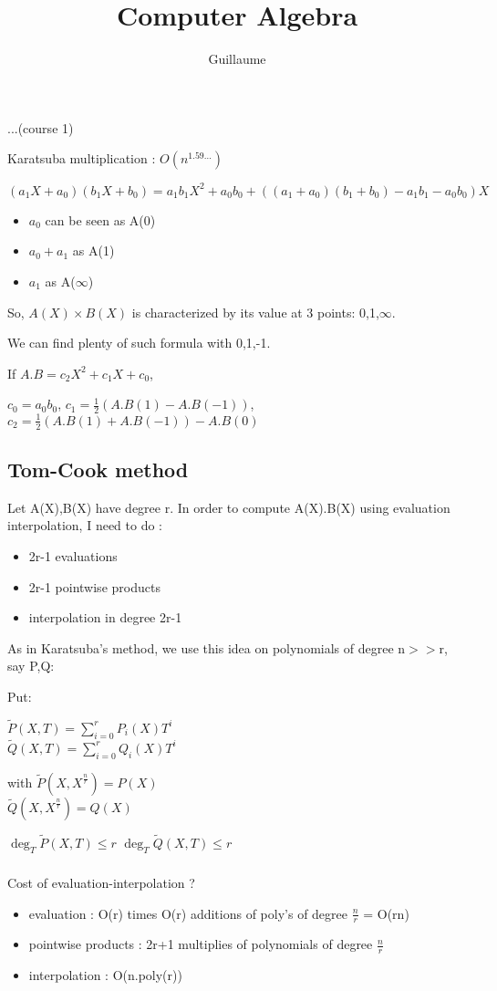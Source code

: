\documentclass{article}
\theoremstyle{definition}
\theoremstyle{remark}
\begin{document}
	
\title{Computer Algebra}
\author{Guillaume}

\maketitle
\tableofcontents

...(course 1)

Karatsuba multiplication : $O(n^{1.59\dots})$

$(a_1X+a_0)(b_1X+b_0) = a_1b_1X^2 + a_0b_0 + ((a_1+a_0)(b_1+b_0) - a_1b_1 - a_0b_0)X$

\begin{itemize}
	\item $a_0$ can be seen as A(0)
	\item $a_0 + a_1$ as A(1)
	\item $a_1$ as A($\infty$)
\end{itemize}
So, $A(X)\times B(X)$ is characterized by its value at 3 points: 0,1,$\infty$.

We can find plenty of such formula with 0,1,-1.

If $A.B = c_2X^2+c_1X+c_0$,

$c_0 = a_0b_0$, $c_1=\frac{1}{2}(A.B(1) - A.B(-1))$, $c_2 = \frac{1}{2}(A.B(1)+A.B(-1)) - A.B(0)$

\subsection{Tom-Cook method}
Let A(X),B(X) have degree r.
In order to compute A(X).B(X) using evaluation interpolation, I need to do :
\begin{itemize}
	\item 2r-1 evaluations
	\item 2r-1 pointwise products
	\item interpolation in degree 2r-1
\end{itemize}

As in Karatsuba's method, we use this idea on polynomials of degree n$>>$r, say P,Q:

Put:

$\tilde{P}(X,T)= \sum_{i=0}^{r} P_i(X)T^i$\\
$\tilde{Q}(X,T) = \sum_{i=0}^{r} Q_i(X)T^i$

with $\tilde{P}(X,X^{\frac{n}{r}}) = P(X)$\\
$\tilde{Q}(X,X^{\frac{n}{r}}) = Q(X)$

$\deg_T \tilde{P}(X,T) \leq r$
$\deg_T \tilde{Q}(X,T) \leq r$
\subparagraph{}
Cost of evaluation-interpolation ?
\begin{itemize}
	\item evaluation : O(r) times O(r) additions of poly's of degree $\frac{n}{r}$ = O(rn)
	\item pointwise products : 2r+1 multiplies of polynomials of degree $\frac{n}{r}$
	\item interpolation : O(n.poly(r))
\end{itemize}
\end{document}
